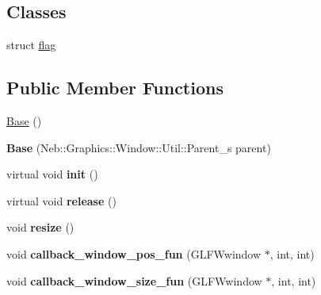 \subsection*{\-Classes}
\begin{DoxyCompactItemize}
\item 
struct \hyperlink{structNeb_1_1Graphics_1_1Window_1_1Base_1_1flag}{flag}
\end{DoxyCompactItemize}
\subsection*{\-Public \-Member \-Functions}
\begin{DoxyCompactItemize}
\item 
\hyperlink{classNeb_1_1Graphics_1_1Window_1_1Base_ac71945a8c24260d3427539bdd6c9bc6b}{\-Base} ()
\item 
\hypertarget{classNeb_1_1Graphics_1_1Window_1_1Base_a8e3c37aa30e0a2a2c4998753dfa27a3e}{{\bfseries \-Base} (\-Neb\-::\-Graphics\-::\-Window\-::\-Util\-::\-Parent\-\_\-s parent)}\label{classNeb_1_1Graphics_1_1Window_1_1Base_a8e3c37aa30e0a2a2c4998753dfa27a3e}

\item 
\hypertarget{classNeb_1_1Graphics_1_1Window_1_1Base_a78d20e60f26c917ed0fb4a2f9c685f6e}{virtual void {\bfseries init} ()}\label{classNeb_1_1Graphics_1_1Window_1_1Base_a78d20e60f26c917ed0fb4a2f9c685f6e}

\item 
\hypertarget{classNeb_1_1Graphics_1_1Window_1_1Base_aa8da9aa63c93c369216a2af313b94e01}{virtual void {\bfseries release} ()}\label{classNeb_1_1Graphics_1_1Window_1_1Base_aa8da9aa63c93c369216a2af313b94e01}

\item 
\hypertarget{classNeb_1_1Graphics_1_1Window_1_1Base_a16653d78a1cdbabc441bd774e8add7cd}{void {\bfseries resize} ()}\label{classNeb_1_1Graphics_1_1Window_1_1Base_a16653d78a1cdbabc441bd774e8add7cd}

\item 
\hypertarget{classNeb_1_1Graphics_1_1Window_1_1Base_ae259e99c30c251c05534b60760ce0afe}{void {\bfseries callback\-\_\-window\-\_\-pos\-\_\-fun} (\-G\-L\-F\-Wwindow $\ast$, int, int)}\label{classNeb_1_1Graphics_1_1Window_1_1Base_ae259e99c30c251c05534b60760ce0afe}

\item 
\hypertarget{classNeb_1_1Graphics_1_1Window_1_1Base_aa017187b6688141211d6bc5e55aa177a}{void {\bfseries callback\-\_\-window\-\_\-size\-\_\-fun} (\-G\-L\-F\-Wwindow $\ast$, int, int)}\label{classNeb_1_1Graphics_1_1Window_1_1Base_aa017187b6688141211d6bc5e55aa177a}


\end{DoxyCompactItemize}
